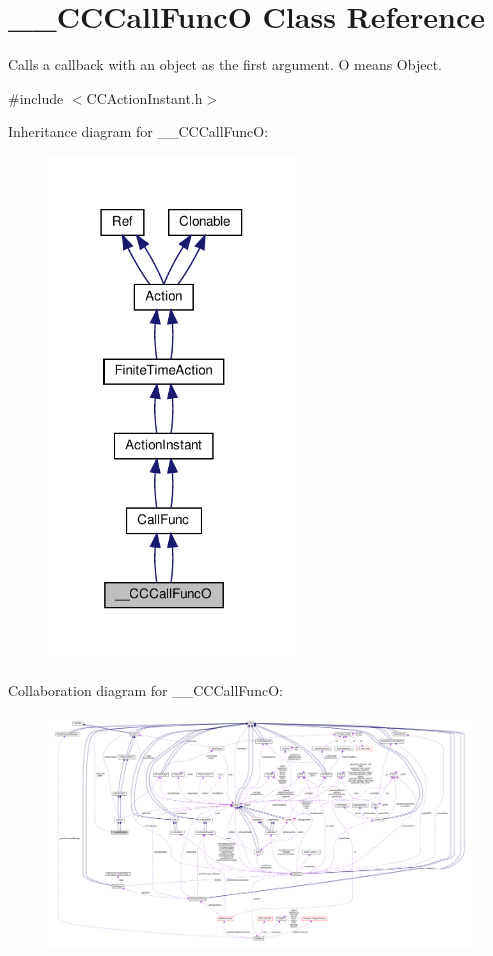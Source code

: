 \hypertarget{class____CCCallFuncO}{}\section{\+\_\+\+\_\+\+C\+C\+Call\+FuncO Class Reference}
\label{class____CCCallFuncO}


Calls a \textquotesingle{}callback\textquotesingle{} with an object as the first argument. O means Object.  




{\ttfamily \#include $<$C\+C\+Action\+Instant.\+h$>$}



Inheritance diagram for \+\_\+\+\_\+\+C\+C\+Call\+FuncO\+:
\nopagebreak
\begin{figure}[H]
\begin{center}
\leavevmode
\includegraphics[width=186pt]{class____CCCallFuncO__inherit__graph}
\end{center}
\end{figure}


Collaboration diagram for \+\_\+\+\_\+\+C\+C\+Call\+FuncO\+:
\nopagebreak
\begin{figure}[H]
\begin{center}
\leavevmode
\includegraphics[width=350pt]{class____CCCallFuncO__coll__graph}
\end{center}
\end{figure}
